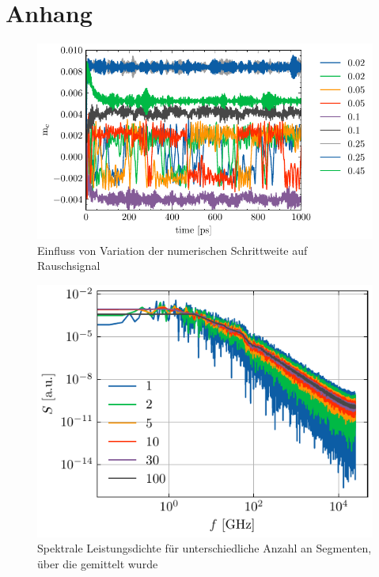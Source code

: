 \documentclass[main.tex]{subfiles}
\begin{document}
\newpage
\section{Anhang}

\begin{figure}[H]
    \centering
    \includegraphics{bilder/plots/dh_variation/mc_time.pdf}
    \caption{Einfluss von Variation der numerischen Schrittweite  auf Rauschsignal }\label{fig:dh-variation}
\end{figure}

\begin{figure}[H]
    \centering
    \includegraphics{bilder/plots/Bz_0mT/spectral_power_densities_segments_26.03meV.pdf}
    \caption{Spektrale Leistungsdichte für unterschiedliche Anzahl an Segmenten, über die gemittelt wurde}\label{fig:spd-seg}
\end{figure}
\end{document}
